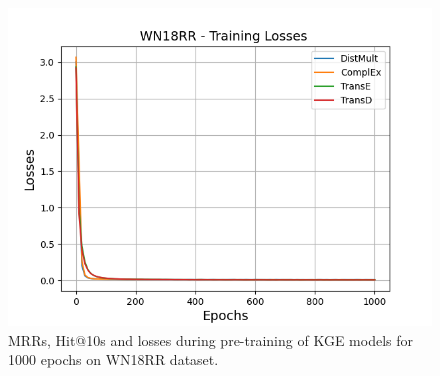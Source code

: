 \begin{figure}
\begin{minipage}{.3\textwidth}
      \includegraphics[width=\linewidth]{figures/results/pretrain/wn18rr/pretrain_wn18rr_losses.png}
    \end{minipage}%
    \caption{MRRs, Hit@10s and losses during pre-training of \ac{KGE} models for 1000 epochs on \textsc{WN18RR} dataset.}
    \label{fig:pretraining}
\end{figure}
